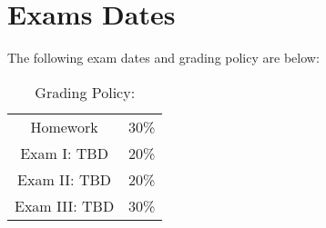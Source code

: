 \documentclass[11pt]{article}
\begin{document}
\section{Exams Dates} 
The following exam dates and grading policy are below:

\begin{table}[h!]
\caption{Grading Policy:}
\begin{center}
\begin{tabular}{cc}
Homework &30\%\\
Exam I:  TBD &20\%\\
Exam  II: TBD & 20\%\\
Exam III:  TBD & 30\%\\
\end{tabular}
\end{center}
\label{default}
\end{table}%
\end{document}
